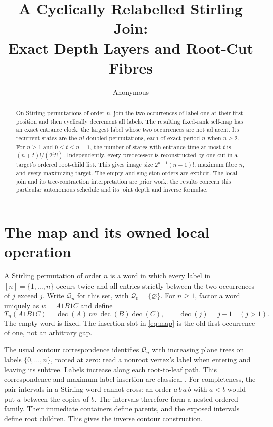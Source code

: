 \documentclass[a4paper,10pt]{amsart}
\title[Depth and fibres of a Stirling join]{A Cyclically Relabelled Stirling Join:\\
Exact Depth Layers and Root-Cut Fibres}
\author{Anonymous}
\date{}
\theoremstyle{remark}
\newcommand{\Q}{\mathcal Q}
\newcommand{\dec}{\operatorname{dec}}
\begin{document}
\begin{abstract}
On Stirling permutations of order $n$, join the two occurrences of label
one at their first position and then cyclically decrement all labels.
The resulting fixed-rank self-map has an exact entrance clock: the largest
label whose two occurrences are not adjacent. Its recurrent states are
the $n!$ doubled permutations, each of exact period $n$ when $n\ge2$.
For $n\ge1$ and $0\le t\le n-1$, the number of states with entrance time
at most $t$ is $(n+t)!/(2^t t!)$. Independently, every predecessor is reconstructed by
one cut in a target's ordered root-child list. This gives image size
$2^{n-1}(n-1)!$, maximum fibre $n$, and every maximizing target.
The empty and singleton orders are explicit. The local join and its
tree-contraction interpretation are prior work; the results concern this
particular autonomous schedule and its joint depth and inverse formulae.
\end{abstract}
\maketitle

\section{The map and its owned local operation}

A Stirling permutation of order $n$ is a word in which every label in
$[n]=\{1,\ldots,n\}$ occurs twice and all entries strictly between the two
occurrences of $j$ exceed $j$. Write $\Q_n$ for this set, with
$\Q_0=\{\varnothing\}$. For $n\ge1$, factor a word uniquely as $w=A1B1C$
and define
\begin{equation}\label{eq:map}
 T_n(A1B1C)=\dec(A)\,nn\,\dec(B)\dec(C),
 \qquad \dec(j)=j-1\quad(j>1).
\end{equation}
The empty word is fixed. The insertion slot in \eqref{eq:map} is the old
first occurrence of one, not an arbitrary gap.

The usual contour correspondence identifies $\Q_n$ with increasing plane
trees on labels $\{0,\ldots,n\}$, rooted at zero: read a nonroot vertex's
label when entering and leaving its subtree. Labels increase along each
root-to-leaf path. This correspondence and maximum-label insertion are
classical \cite{janson2008plane,janson2011generalized}.
For completeness, the pair intervals in a Stirling word cannot cross:
an order $a\,b\,a\,b$ with $a<b$ would put $a$ between the copies of $b$.
The intervals therefore form a nested ordered family. Their immediate
containers define parents, and the exposed intervals define root children.
This gives the inverse contour construction.
\end{document}
